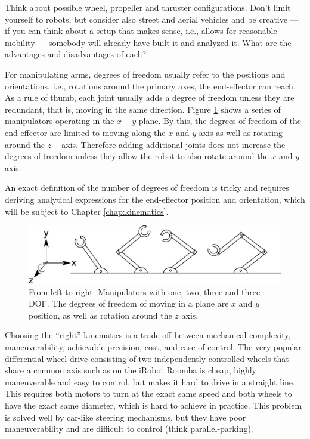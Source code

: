 \begin{framed}Think about possible wheel, propeller and thruster configurations. Don't limit yourself to robots, but consider also street and aerial vehicles and be creative --- if you can think about a setup that makes sense, i.e., allows for reasonable mobility --- somebody will already have built it and analyzed it. What are the advantages and disadvantages of each?
\end{framed}

For manipulating arms, degrees of freedom usually refer to the positions and orientations, i.e., rotations around the primary axes, the end-effector can reach. As a rule of thumb, each joint usually adds a degree of freedom unless they are redundant, that is, moving in the same direction. Figure \ref{fig:basickinematics} shows a series of manipulators operating in the $x-y$-plane. By this, the degrees of freedom of the end-effector are limited to moving along the $x$ and $y$-axis as well as rotating around the $z-$axis. Therefore adding additional joints does not increase the degrees of freedom unless they allow the robot to also rotate around the $x$ and $y$ axis. 

An exact definition of the number of degrees of freedom is tricky and requires deriving analytical expressions for the end-effector position and orientation, which will be subject to Chapter \ref{chap:kinematics}.

\begin{figure}
	\centering
		\includegraphics[width=\textwidth]{figs/basickinematics.png}
	\caption{From left to right: Manipulators with one, two, three and three DOF. The degrees of freedom of moving in a plane are $x$ and $y$ position, as well as rotation around the $z$ axis.}
	\label{fig:basickinematics}
\end{figure}

Choosing the ``right'' kinematics is a trade-off between mechanical complexity, maneuverability, achievable precision, cost, and ease of control. The very popular differential-wheel drive consisting of two independently controlled wheels that share a common axis such as on the iRobot Roomba is cheap, highly maneuverable and easy to control, but makes it hard to drive in a straight line. This requires both motors to turn at the exact same speed and both wheels to have the exact same diameter, which is hard to achieve in practice. This problem is solved well by car-like steering mechanisms, but they have poor maneuverability and are difficult to control (think parallel-parking).


